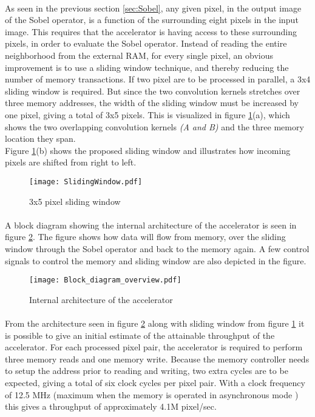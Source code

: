 \paragraph*{}
As seen in the previous section \ref{sec:Sobel}, any given pixel, in the output image of the Sobel operator, is a function of the surrounding eight pixels in the input image. This requires that the accelerator is having access to these surrounding pixels, in order to evaluate the Sobel operator. Instead of reading the entire neighborhood from the external RAM, for every single pixel, an obvious improvement is to use a sliding window technique, and thereby reducing the number of memory transactions. If two pixel are to be processed in parallel, a 3x4 sliding window is required. But since the two convolution kernels stretches over three memory addresses, the width of the sliding window must be increased by one pixel, giving a total of 3x5 pixels. This is visualized in figure \ref{fig:shift_register}(a), which shows the two overlapping convolution kernels \emph{(A and B)} and the three memory location they span. \\
Figure \ref{fig:shift_register}(b) shows the proposed sliding window and illustrates how incoming pixels are shifted from right to left.

\begin{figure}[H]
	\centering
	\texttt{[image: SlidingWindow.pdf]}
	\caption{3x5 pixel sliding window}
	\label{fig:shift_register}
\end{figure}

\paragraph*{}
A block diagram showing the internal architecture of the accelerator is seen in figure \ref{fig:AccBlockDiagram}. The figure shows how data will flow from memory, over the sliding window through the Sobel operator and back to the memory again. A few control signals to control the memory and sliding window are also depicted in the figure. 

\begin{figure}[H]
	\centering
	\texttt{[image: Block\_diagram\_overview.pdf]}
	\caption{Internal architecture of the accelerator}
	\label{fig:AccBlockDiagram}
\end{figure}

\paragraph*{}
From the architecture seen in figure \ref{fig:AccBlockDiagram} along with sliding window from figure \ref{fig:shift_register} it is possible to give an initial estimate of the attainable throughput of the accelerator. For each processed pixel pair, the accelerator is required to perform three memory reads and one memory write. Because the memory controller needs to setup the address prior to reading and writing, two extra cycles are to be expected, giving a total of six clock cycles per pixel pair.
With a clock frequency of 12.5 MHz (maximum when the memory is operated in asynchronous mode \cite{Micron:CellularRAM}) this gives a throughput of approximately 4.1M pixel/sec.
